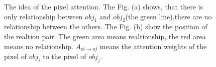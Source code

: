 \begin{figure}[H]
	\caption[The idea of the pixel attention loss]{The idea of the pixel attention. The Fig. (a) shows, that there is only relationship between $obj_1$ and $obj_2$(the green line),there are no relationship between the others. The Fig. (b) show the position of the realtion pair. The green area means realtionship, the red area means no relationship. $A_{oi \to oj}$ means the attention weights of the pixel of $obj_i$ to  the pixel of $obj_j$.}
	\label{fig:idea_pixelloss}
\end{figure}

